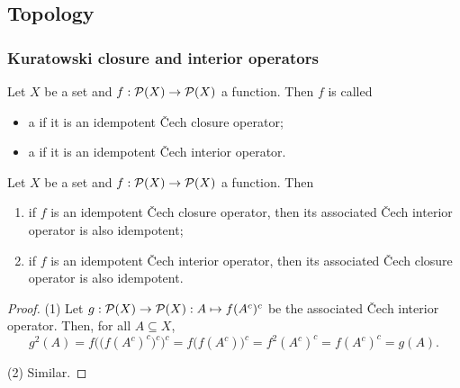 \subsection{Topology}
\subsubsection{Kuratowski closure and interior operators}
\begin{definition}
Let $X$ be a set and $f: \operatorname{\mathcal{P}}(X)\to \operatorname{\mathcal{P}}(X)$ a function. Then $f$ is called
\begin{itemize}
\item a  if it is an idempotent Čech closure operator;
\item a  if it is an idempotent Čech interior operator.
\end{itemize}
\end{definition}

\begin{lemma}
Let $X$ be a set and $f: \operatorname{\mathcal{P}}(X)\to \operatorname{\mathcal{P}}(X)$ a function. Then
\begin{enumerate}
\item if $f$ is an idempotent Čech closure operator, then its associated Čech interior operator is also idempotent;
\item if $f$ is an idempotent Čech interior operator, then its associated Čech closure operator is also idempotent.
\end{enumerate}
\end{lemma}
\begin{proof}
(1) Let $g: \operatorname{\mathcal{P}}(X)\to \operatorname{\mathcal{P}}(X): A\mapsto f(A^c)^c$ be the associated Čech interior operator. Then, for all $A\subseteq X$,
\[ g^2(A) = f\Big(\big(f(A^c)^c\big)^c\Big)^c = f\Big(f(A^c)\Big)^c = f^2(A^c)^c = f(A^c)^c = g(A). \]

(2) Similar.
\end{proof}

